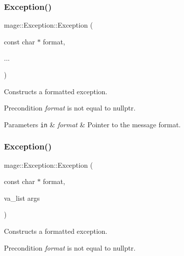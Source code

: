 \subsubsection{\texorpdfstring{Exception()}{Exception()}\hspace{0.1cm}{\footnotesize\ttfamily [2/5]}}
{\footnotesize\ttfamily mage\+::\+Exception\+::\+Exception (\begin{DoxyParamCaption}\item[{const char $\ast$}]{format,  }\item[{}]{... }\end{DoxyParamCaption})\hspace{0.3cm}{\ttfamily [explicit]}}

Constructs a formatted exception.

\begin{DoxyPrecond}{Precondition}
{\itshape format} is not equal to {\ttfamily nullptr}. 
\end{DoxyPrecond}

\begin{DoxyParams}[1]{Parameters}
\mbox{\tt in}  & {\em format} & Pointer to the message format. \\
\hline
\end{DoxyParams}
\hypertarget{classmage_1_1_exception_a8296b7972fb8ca777399a5a640f2c40a}{}\label{classmage_1_1_exception_a8296b7972fb8ca777399a5a640f2c40a} 
\subsubsection{\texorpdfstring{Exception()}{Exception()}\hspace{0.1cm}{\footnotesize\ttfamily [3/5]}}
{\footnotesize\ttfamily mage\+::\+Exception\+::\+Exception (\begin{DoxyParamCaption}\item[{const char $\ast$}]{format,  }\item[{va\+\_\+list}]{args }\end{DoxyParamCaption})\hspace{0.3cm}{\ttfamily [explicit]}}

Constructs a formatted exception.

\begin{DoxyPrecond}{Precondition}
{\itshape format} is not equal to {\ttfamily nullptr}. 
\end{DoxyPrecond}

